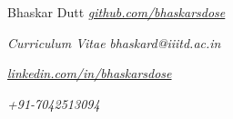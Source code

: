 \documentclass[10pt]{report}
\begin{document}
	
\Huge\item Bhaskar Dutt
\hfill\small\faGithub\hspace{1pt} \href{https://github.com/bhaskarsdose}{\color{gray}\textit{github.com/bhaskarsdose}}
\item\textit{\large\color{Gray}Curriculum Vitae}
\hfill\faAt\hspace{1pt}\textit{\color{gray} bhaskard@iiitd.ac.in}\vspace{1pt}

\hfill\faLinkedin\hspace{1pt} \href{https://www.linkedin.com/in/bhaskarsdose}{\color{gray}\textit{linkedin.com/in/bhaskarsdose}}\vspace{1pt}

\hfill\faMobile\hspace{1pt}\textit{\color{gray}+91-7042513094} \vspace{1pt}
\end{document}
